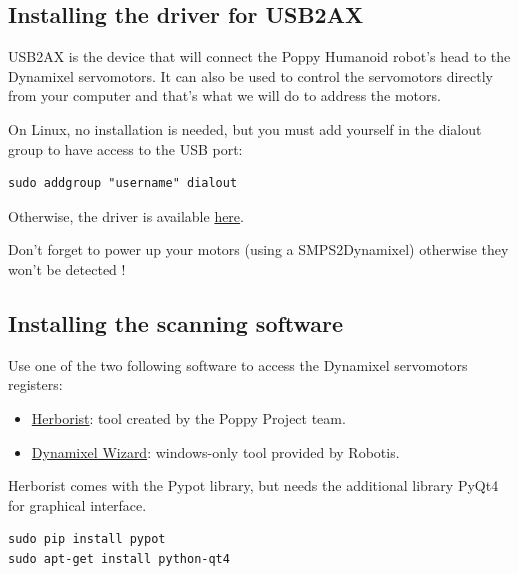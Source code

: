 \documentclass{article}
\begin{document}
\subsection{Installing the driver for USB2AX}

USB2AX is the device that will connect the Poppy Humanoid robot's head to the Dynamixel servomotors. It can also be used to control the servomotors directly from your computer and that's what we will do to address the motors.

On Linux, no installation is needed, but you must add yourself in the dialout group to have access to the USB port:
 \begin{verbatim}
sudo addgroup "username" dialout
\end{verbatim}

Otherwise, the driver is available \href{http://www.xevelabs.com/doku.php?id=product:usb2ax:quickstart}{here}.

Don't forget to power up your motors (using a SMPS2Dynamixel) otherwise they won't be detected !

\subsection{Installing the scanning software}

Use one of the two following software to access the Dynamixel servomotors registers:

\begin{itemize}
\item \href{http://poppy-project.github.io/pypot/herborist.html}{Herborist}: tool created by the Poppy Project team. 
\item \href{http://support.robotis.com/en/software/roboplus/dynamixel_monitor/quickstart/dynamixel\_monitor\_connection.htm}{Dynamixel Wizard}: windows-only tool provided by Robotis.
\end{itemize}

Herborist comes with the Pypot library, but needs the additional library PyQt4 for graphical interface.
\begin{verbatim}
sudo pip install pypot
sudo apt-get install python-qt4
\end{verbatim}
\end{document}
